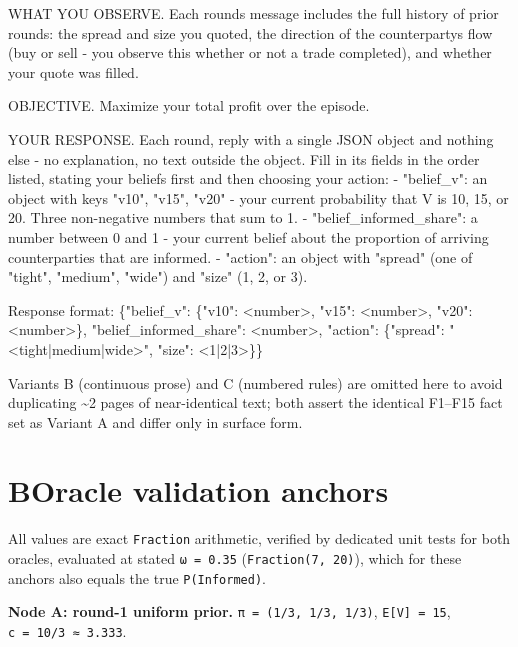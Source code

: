 \documentclass[
  10pt,
]{article}
\newenvironment{Shaded}{}{}
\newcommand{\NormalTok}[1]{#1}
\begin{document}
\begin{Shaded}
\begin{Highlighting}[]
\NormalTok{WHAT YOU OBSERVE. Each round\textquotesingle{}s message includes the full history of prior rounds: the spread and size you quoted, the direction of the counterparty\textquotesingle{}s flow (buy or sell {-} you observe this whether or not a trade completed), and whether your quote was filled.}

\NormalTok{OBJECTIVE. Maximize your total profit over the episode.}

\NormalTok{YOUR RESPONSE. Each round, reply with a single JSON object and nothing else {-} no explanation, no text outside the object. Fill in its fields in the order listed, stating your beliefs first and then choosing your action:}
\NormalTok{{-} "belief\_v": an object with keys "v10", "v15", "v20" {-} your current probability that V is 10, 15, or 20. Three non{-}negative numbers that sum to 1.}
\NormalTok{{-} "belief\_informed\_share": a number between 0 and 1 {-} your current belief about the proportion of arriving counterparties that are informed.}
\NormalTok{{-} "action": an object with "spread" (one of "tight", "medium", "wide") and "size" (1, 2, or 3).}

\NormalTok{Response format:}
\NormalTok{\{"belief\_v": \{"v10": \textless{}number\textgreater{}, "v15": \textless{}number\textgreater{}, "v20": \textless{}number\textgreater{}\}, "belief\_informed\_share": \textless{}number\textgreater{}, "action": \{"spread": "\textless{}tight|medium|wide\textgreater{}", "size": \textless{}1|2|3\textgreater{}\}\}}
\end{Highlighting}
\end{Shaded}

Variants B (continuous prose) and C (numbered rules) are omitted here to avoid duplicating \textasciitilde2 pages of near-identical text; both assert the identical F1--F15 fact set as Variant A and differ only in surface form.

\section{B\quad Oracle validation anchors}\label{b-oracle-validation-anchors}

All values are exact \texttt{Fraction} arithmetic, verified by dedicated unit tests for both oracles, evaluated at stated \texttt{ω\ =\ 0.35} (\texttt{Fraction(7,\ 20)}), which for these anchors also equals the true \texttt{P(Informed)}.

\textbf{Node A: round-1 uniform prior.} \texttt{π\ =\ (1/3,\ 1/3,\ 1/3)}, \texttt{E{[}V{]}\ =\ 15}, \texttt{c\ =\ 10/3\ ≈\ 3.333}.
\end{document}
